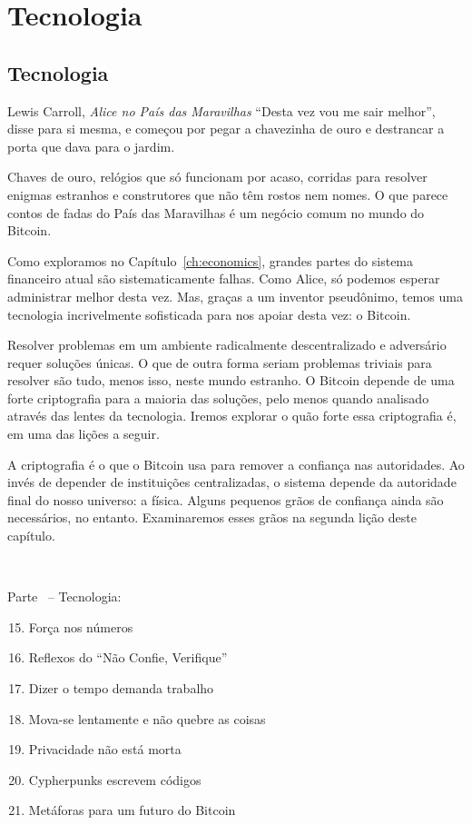 \part{Tecnologia}
\label{ch:technology}
\chapter*{Tecnologia}

\begin{chapquote}{Lewis Carroll, \textit{Alice no País das Maravilhas}}
\enquote{Desta vez vou me sair melhor}, disse para si mesma, e começou por pegar a chavezinha de ouro e destrancar a porta que dava para o jardim.
\end{chapquote}

Chaves de ouro, relógios que só funcionam por acaso, corridas para resolver enigmas estranhos e construtores que não têm rostos nem nomes. O que parece contos de fadas do País das Maravilhas é um negócio comum no mundo do Bitcoin.

Como exploramos no Capítulo~\ref{ch:economics}, grandes partes do sistema financeiro atual são sistematicamente falhas. Como Alice, só podemos esperar administrar melhor desta vez. Mas, graças a um inventor pseudônimo, temos uma tecnologia incrivelmente sofisticada para nos apoiar desta vez: o Bitcoin.

Resolver problemas em um ambiente radicalmente descentralizado e adversário requer soluções únicas. O que de outra forma seriam problemas triviais para resolver são tudo, menos isso, neste mundo estranho. O Bitcoin depende de uma forte criptografia para a maioria das soluções, pelo menos quando analisado através das lentes da tecnologia. Iremos explorar o quão forte essa criptografia é, em uma das lições a seguir.

A criptografia é o que o Bitcoin usa para remover a confiança nas autoridades. Ao invés de depender de instituições centralizadas, o sistema depende da autoridade final do nosso universo: a física. Alguns pequenos grãos de confiança ainda são necessários, no entanto. Examinaremos esses grãos na segunda lição deste capítulo.

~

\begin{samepage}
Parte~\ref{ch:technology} -- Tecnologia:

\begin{enumerate}
  \setcounter{enumi}{14}
  \item Força nos números
  \item Reflexos do \enquote{Não Confie, Verifique}
  \item Dizer o tempo demanda trabalho
  \item Mova-se lentamente e não quebre as coisas
  \item Privacidade não está morta
  \item Cypherpunks escrevem códigos
  \item Metáforas para um futuro do Bitcoin
\end{enumerate}
\end{samepage}

